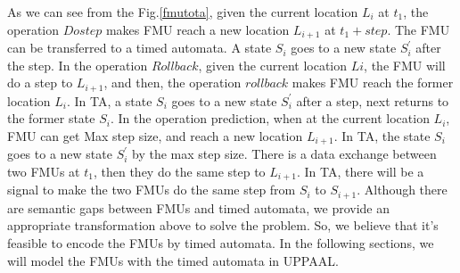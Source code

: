 %
As we can see from the Fig.\ref{fmutota}, given the current location $L_{i}$ at $t_{1}$, the operation $Dostep$ makes FMU reach a new location $L_{i+1}$ at $t_{1}+step$. The FMU can be transferred to a timed automata. A state $S_{i}$ goes to a new state $S_{i}^{\prime}$ after the step. In the operation $Rollback$, given the current location $L{i}$, the FMU will do a step to $L_{i+1}$, and then, the operation $rollback$ makes FMU reach the former location $L_{i}$. In TA, a state $S_{i}$ goes to a new state $S_{i}^{\prime}$ after a step, next returns to the former state $S_{i}$. In the operation prediction, when at the current location $L_{i}$, FMU can get Max step size, and reach a new location $L_{i+1}$. In TA, the state $S_{i}$ goes to a new state $S_{i}^{\prime}$ by the max step size. There is a data exchange between two FMUs at $t_{1}$, then they do the same step to $L_{i+1}$. In TA, there will be a signal to make the two FMUs do the same step from $S_{i}$ to $S_{i+1}$.
Although there are semantic gaps between FMUs and timed automata, we provide an appropriate transformation above to solve the problem. So, we believe that it's feasible to encode the FMUs by timed automata. In the following sections, we will model the FMUs with the timed automata in UPPAAL.


